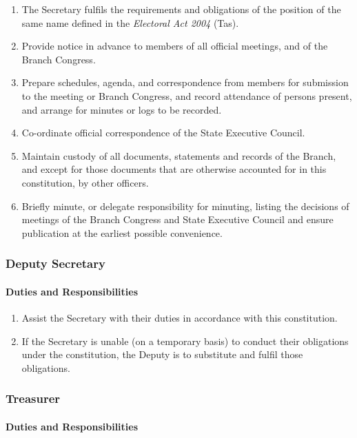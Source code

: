 \documentclass[a4paper,titlepage,8.5pt]{article}
\newcommand{\stateorterritory}{State}
\newcommand{\act}{\tasact}
\newcommand{\tasact}{\emph{Electoral Act 2004} (Tas)}
\begin{document}
\begin{enumerate}
\item The Secretary fulfils the requirements and obligations of the position of the same name defined in the {\act}.
\item Provide notice in advance to members of all official meetings, and of the Branch Congress.
\item Prepare schedules, agenda, and correspondence from members for submission to the meeting or Branch Congress, and record attendance of persons present, and arrange for minutes or logs to be recorded.
\item Co-ordinate official correspondence of the {\stateorterritory} Executive Council.
\item Maintain custody of all documents, statements and records of the Branch, and except for those documents that are otherwise accounted for in this constitution, by other officers.
\item Briefly minute, or delegate responsibility for minuting, listing the decisions of meetings of the Branch Congress and {\stateorterritory} Executive Council and ensure publication at the earliest possible convenience.
\end{enumerate}

\subsubsection{Deputy Secretary}

\paragraph{Duties and Responsibilities}

\begin{enumerate}
\item Assist the Secretary with their duties in accordance with this constitution.
\item If the Secretary is unable (on a temporary basis) to conduct their obligations under the constitution, the Deputy is to substitute and fulfil those obligations.
\end{enumerate}

\subsubsection{Treasurer}

\paragraph{Duties and Responsibilities}
\end{document}
